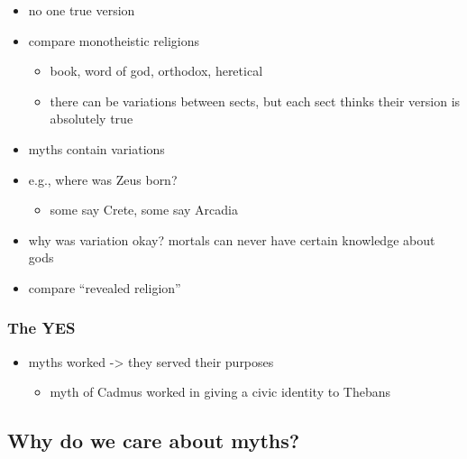 \documentclass[
  12pt]{findlay}
\providecommand{\tightlist}{%
  \setlength{\itemsep}{0pt}\setlength{\parskip}{0pt}}
\begin{document}
\begin{itemize}
\tightlist
\item
  no one true version
\item
  compare monotheistic religions

  \begin{itemize}
  \tightlist
  \item
    book, word of god, orthodox, heretical
  \item
    there can be variations between sects, but each sect thinks their
    version is absolutely true
  \end{itemize}
\item
  myths contain variations
\item
  e.g., where was Zeus born?

  \begin{itemize}
  \tightlist
  \item
    some say Crete, some say Arcadia
  \end{itemize}
\item
  why was variation okay? mortals can never have certain knowledge about
  gods
\item
  compare ``revealed religion''
\end{itemize}

\hypertarget{the-yes}{%
\subsubsection{The YES}\label{the-yes}}

\begin{itemize}
\tightlist
\item
  myths worked -\textgreater{} they served their purposes

  \begin{itemize}
  \tightlist
  \item
    myth of Cadmus worked in giving a civic identity to Thebans
  \end{itemize}
\end{itemize}

\hypertarget{why-do-we-care-about-myths}{%
\subsection{Why do we care about
myths?}\label{why-do-we-care-about-myths}}
\end{document}
